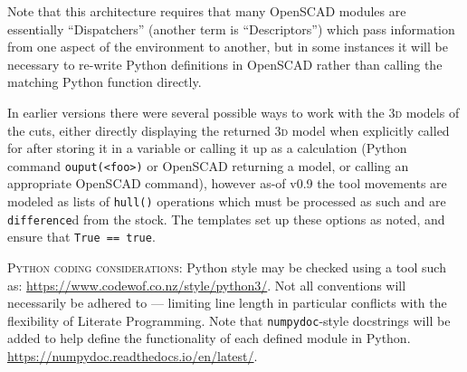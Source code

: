 \documentclass{ltxdoc}
\begin{document}
\noindent Note that this architecture requires that many OpenSCAD modules are essentially ``Dispatchers'' (another term is ``Descriptors'') which pass information from one aspect of the environment to another, but in some instances it will be necessary to re-write Python definitions in OpenSCAD rather than calling the matching Python function directly.

In earlier versions there were several possible ways to work with the \textsc{3d} models of the cuts, either directly displaying the returned \textsc{3d} model when explicitly called for after storing it in a variable or calling it up as a calculation (Python command \verb|ouput(<foo>)| or OpenSCAD returning a model, or calling an appropriate OpenSCAD command), however as-of v0.9 the tool movements are modeled as lists of \verb|hull()| operations which must be processed as such and are \verb|difference|d from the stock. The templates set up these options as noted, and ensure that \verb|True == true|.



\smallskip

\noindent\textsc{Python coding considerations:} Python style may be checked using a tool such as: \url{https://www.codewof.co.nz/style/python3/}. Not all conventions will necessarily be adhered to --- limiting line length in particular conflicts with the flexibility of Literate Programming. Note that \verb|numpydoc|-style docstrings will be added to help define the functionality of each defined module in Python. \url{https://numpydoc.readthedocs.io/en/latest/}.
\end{document}
